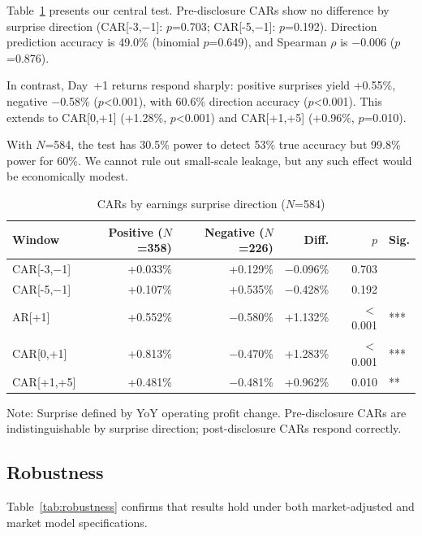 \documentclass[review,authoryear]{elsarticle}
\begin{document}
Table~\ref{tab:surprise} presents our central test. Pre-disclosure CARs show no difference by surprise direction (CAR[-3,$-$1]: $p$=0.703; CAR[-5,$-$1]: $p$=0.192). Direction prediction accuracy is 49.0\% (binomial $p$=0.649), and Spearman $\rho$ is $-$0.006 ($p$=0.876).

In contrast, Day~+1 returns respond sharply: positive surprises yield +0.55\%, negative $-$0.58\% ($p$<0.001), with 60.6\% direction accuracy ($p$<0.001). This extends to CAR[0,+1] (+1.28\%, $p$<0.001) and CAR[+1,+5] (+0.96\%, $p$=0.010).

With $N$=584, the test has 30.5\% power to detect 53\% true accuracy but 99.8\% power for 60\%. We cannot rule out small-scale leakage, but any such effect would be economically modest.

\begin{table}[ht]
\caption{CARs by earnings surprise direction ($N$=584)}
\label{tab:surprise}
\begin{tabular}{lrrrrl}
\toprule
Window & Positive ($N$=358) & Negative ($N$=226) & Diff. & $p$ & Sig. \\
\midrule
CAR[-3,$-$1] & +0.033\% & +0.129\% & $-$0.096\% & 0.703 & \\
CAR[-5,$-$1] & +0.107\% & +0.535\% & $-$0.428\% & 0.192 & \\
\midrule
AR[+1] & +0.552\% & $-$0.580\% & +1.132\% & $<$0.001 & *** \\
CAR[0,+1] & +0.813\% & $-$0.470\% & +1.283\% & $<$0.001 & *** \\
CAR[+1,+5] & +0.481\% & $-$0.481\% & +0.962\% & 0.010 & ** \\
\bottomrule
\end{tabular}
\begin{flushleft}
\small Note: Surprise defined by YoY operating profit change. Pre-disclosure CARs are indistinguishable by surprise direction; post-disclosure CARs respond correctly.
\end{flushleft}
\end{table}

\subsection{Robustness}

Table~\ref{tab:robustness} confirms that results hold under both market-adjusted and market model specifications.
\end{document}
